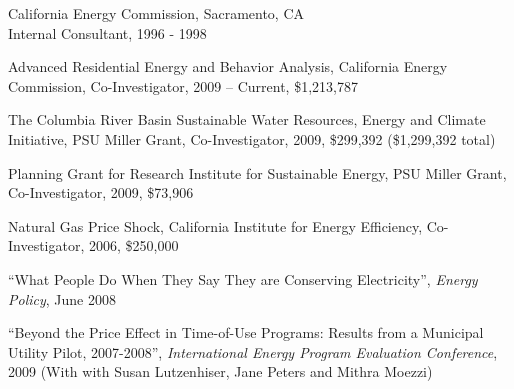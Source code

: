 \documentclass[Computer Science]{vita}
\begin{document}
\begin{vita}
\begin{Experience}
  \item California Energy Commission, Sacramento, CA\\
    Internal Consultant, 1996 - 1998
	  \end{Experience}

 \begin{Selected Grants and Sponsored Research}

\item Advanced Residential Energy and Behavior Analysis, California Energy Commission, Co-Investigator, 2009 -- Current, \$1,213,787

\item The Columbia River Basin Sustainable Water Resources, Energy and Climate Initiative,  PSU Miller Grant, Co-Investigator, 2009, \$299,392 (\$1,299,392 total)

\item Planning Grant for Research Institute for Sustainable Energy, PSU Miller Grant,  Co-Investigator, 2009, \$73,906

  \item Natural Gas Price Shock, California Institute for Energy
    Efficiency, Co-Investigator, 2006, \$250,000



  \end{Selected Grants and Sponsored Research}

  \begin{Selected Publications}


    \begin{Papers in Refereed Journals}

    \item ``What People Do When They Say They are Conserving
      Electricity'', \emph{Energy Policy}, June 2008



    \end{Papers in Refereed Journals}

    \begin{Papers at Refereed Conferences}
    
    \item ``Beyond the Price Effect in Time-of-Use Programs: Results
      from a Municipal Utility Pilot, 2007-2008'', \emph{International
        Energy Program Evaluation Conference}, 2009 (With with Susan
      Lutzenhiser, Jane Peters and Mithra Moezzi)


\end{Papers at Refereed Conferences}
\end{Selected Publications}
\end{vita}
\end{document}
